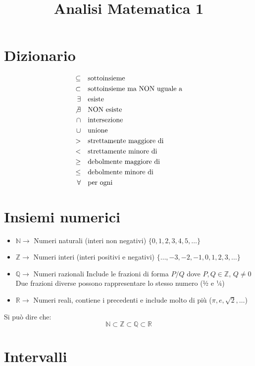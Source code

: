 \documentclass[12pt,a4paper]{article}
\title{Analisi Matematica 1}
\author{}
\date{}
\let\oldsection\section
\renewcommand{\section}{\clearpage\oldsection}
\begin{document}
\maketitle
\tableofcontents
\section{Dizionario}

\begin{align*}
\subseteq &\quad \text{sottoinsieme} \\
\subset &\quad \text{sottoinsieme ma NON uguale a} \\
\exists &\quad \text{esiste} \\
\not\exists &\quad \text{NON esiste} \\
\cap &\quad \text{intersezione} \\
\cup &\quad \text{unione} \\
> &\quad \text{strettamente maggiore di} \\
< &\quad \text{strettamente minore di} \\
\ge &\quad \text{debolmente maggiore di} \\
\le &\quad \text{debolmente minore di} \\
\forall &\quad \text{per ogni}
\end{align*}

\section{Insiemi numerici}

\begin{itemize}
\item $\mathbb{N} \to$ Numeri naturali (interi non negativi)  
$\{0,1,2,3,4,5,\dots\}$
\item $\mathbb{Z} \to$ Numeri interi (interi positivi e negativi)  
$\{\dots,-3,-2,-1,0,1,2,3,\dots\}$
\item $\mathbb{Q} \to$ Numeri razionali  
Include le frazioni di forma $P/Q$ dove $P,Q \in \mathbb{Z}$, $Q \neq 0$  
Due frazioni diverse possono rappresentare lo stesso numero (½ e ¼)
\item $\mathbb{R} \to$ Numeri reali, contiene i precedenti e include molto di più ($\pi, e, \sqrt{2}, \dots$)
\end{itemize}

Si può dire che:  
\[
\mathbb{N} \subset \mathbb{Z} \subset \mathbb{Q} \subset \mathbb{R}
\]

\section{Intervalli}
\end{document}
